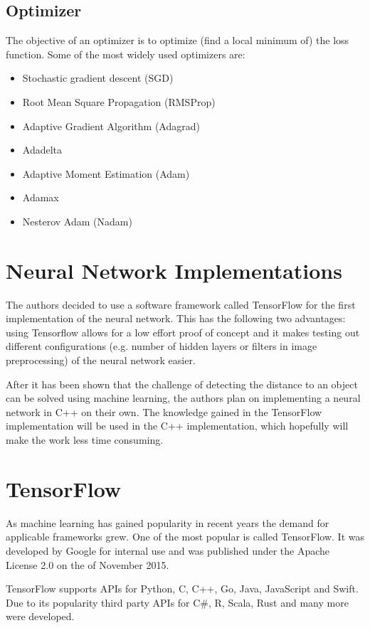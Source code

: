 \subsection{Optimizer}
The objective of an optimizer is to optimize (find a local minimum of) the loss function. Some of the most widely used optimizers are:

\begin{itemize}
	\item Stochastic gradient descent (SGD)
	\item Root Mean Square Propagation (RMSProp)
	\item Adaptive Gradient Algorithm (Adagrad)
	\item Adadelta
	\item Adaptive Moment Estimation (Adam)
	\item Adamax
	\item Nesterov Adam (Nadam)
\end{itemize}

\section{Neural Network Implementations}
The authors decided to use a software framework called TensorFlow for the first implementation of the neural network. This has the following two advantages: using Tensorflow allows for a low effort proof of concept and it makes testing out different configurations (e.g. number of hidden layers or filters in image preprocessing) of the neural network easier.

After it has been shown that the challenge of detecting the distance to an object can be solved using machine learning, the authors plan on implementing a neural network in C++ on their own. The knowledge gained in the TensorFlow implementation will be used in the C++ implementation, which hopefully will make the work less time consuming.

\section{TensorFlow}
As machine learning has gained popularity in recent years the demand for applicable frameworks grew. One of the most popular is called TensorFlow. It was developed by Google for internal use and was published under the Apache License 2.0 on the  of November 2015.

TensorFlow supports APIs for Python, C, C++, Go, Java, JavaScript and Swift.
Due to its popularity third party APIs for C\#, R, Scala, Rust and many more were developed.

